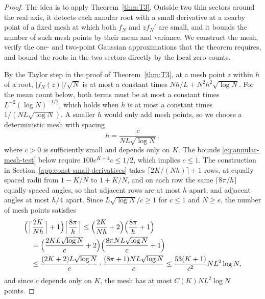 \begin{proof}
The idea is to apply Theorem~\ref{thm:T3}. Outside two thin sectors
around the real axis, it detects each annular root with a small
derivative at a nearby point of a fixed mesh at which both $f_N$ and
$zf_N'$ are small, and it bounds the number of such mesh points by their
mean and variance. We construct the mesh, verify the one- and two-point
Gaussian approximations that the theorem requires, and bound the roots
in the two sectors directly by the local zero counts.

By the Taylor step in the proof of Theorem~\ref{thm:T3}, at a mesh point
$z$ within $h$ of a root, $|f_N(z)|/\sqrt N$ is at most a constant times
$Nh/L+N^2h^2\sqrt{\log N}$. For the mean count below, both terms must be
at most a constant times $L^{-2}(\log N)^{-1/2}$, which holds when $h$ is
at most a constant times $1/(NL\sqrt{\log N})$. A smaller $h$ would only
add mesh points, so we choose a deterministic mesh with spacing
\[
 h=\frac{c}{NL\sqrt{\log N}},
\]
where $c>0$ is sufficiently small and depends only on $K$. The bounds
\eqref{eq:annular-mesh-test} below require $100e^{K+4}c\le1/2$, which
implies $c\le1$.
The construction in
Section~\ref{app:const-small-derivatives} takes $\lceil2K/(Nh)\rceil+1$
rows, at equally spaced radii from $1-K/N$ to $1+K/N$, and on each row the
same $\lceil8\pi/h\rceil$ equally spaced angles, so that adjacent rows are
at most $h$ apart, and adjacent angles at most $h/4$ apart. Since
$L\sqrt{\log N}/c\ge1$ for $c\le1$ and $N\ge e$, the number of mesh points
satisfies
\begin{align*}
 &\Bigl(\Bigl\lceil\frac{2K}{Nh}\Bigr\rceil+1\Bigr)
 \Bigl\lceil\frac{8\pi}h\Bigr\rceil
 \le\Bigl(\frac{2K}{Nh}+2\Bigr)\Bigl(\frac{8\pi}h+1\Bigr)\\
 &\quad=\Bigl(\frac{2KL\sqrt{\log N}}c+2\Bigr)
   \Bigl(\frac{8\pi NL\sqrt{\log N}}c+1\Bigr)\\
 &\quad\le\frac{(2K+2)L\sqrt{\log N}}c\cdot\frac{(8\pi+1)NL\sqrt{\log N}}c
 \le\frac{53(K+1)}{c^2}NL^2\log N,
\end{align*}
and since $c$ depends only on $K$, the mesh has at most
$C(K)NL^2\log N$ points.


\end{proof}
